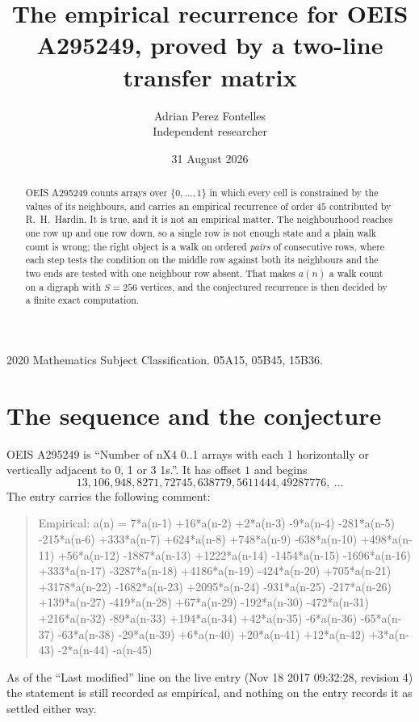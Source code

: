 \documentclass[11pt,a4paper]{article}
\title{The empirical recurrence for OEIS A295249, proved by a two-line transfer matrix}
\author{Adrian Perez Fontelles\\ \small Independent researcher}
\date{31 August 2026}
\theoremstyle{plain}
\theoremstyle{definition}
\begin{document}
\maketitle

\begin{abstract}
OEIS A295249 counts arrays over $\{0,\dots,1\}$ in which every cell is constrained by the
values of its neighbours, and carries an empirical recurrence of order $45$ contributed
by R.~H.~Hardin. It is true, and it is not an empirical matter. The neighbourhood reaches one
row up and one row down, so a single row is not enough state and a plain walk count
is wrong; the right object is a walk on ordered \emph{pairs} of consecutive rows, where
each step tests the condition on the middle row against both its neighbours and the two
ends are tested with one neighbour row absent. That makes $a(n)$ a walk count on a digraph
with $S=256$ vertices, and the conjectured recurrence is then decided by a finite exact
computation.
\end{abstract}

\noindent\small 2020 Mathematics Subject Classification. 05A15, 05B45, 15B36.\normalsize

\section{The sequence and the conjecture}

OEIS A295249 is ``Number of nX4 0..1 arrays with each 1 horizontally or vertically adjacent to 0, 1 or 3 1s.''. It has offset $1$ and begins
\[
13, 106, 948, 8271, 72745, 638779, 5611444, 49287776,\ \dots
\]
The entry carries the following comment:
\begin{quote}\small
Empirical: a(n) = 7*a(n-1) +16*a(n-2) +2*a(n-3) -9*a(n-4) -281*a(n-5) -215*a(n-6) +333*a(n-7) +624*a(n-8) +748*a(n-9) -638*a(n-10) +498*a(n-11) +56*a(n-12) -1887*a(n-13) +1222*a(n-14) -1454*a(n-15) -1696*a(n-16) +333*a(n-17) -3287*a(n-18) +4186*a(n-19) -424*a(n-20) +705*a(n-21) +3178*a(n-22) -1682*a(n-23) +2095*a(n-24) -931*a(n-25) -217*a(n-26) +139*a(n-27) -419*a(n-28) +67*a(n-29) -192*a(n-30) -472*a(n-31) +216*a(n-32) -89*a(n-33) +194*a(n-34) +42*a(n-35) -6*a(n-36) -65*a(n-37) -63*a(n-38) -29*a(n-39) +6*a(n-40) +20*a(n-41) +12*a(n-42) +3*a(n-43) -2*a(n-44) -a(n-45)
\end{quote}
As of the ``Last modified'' line on the live entry (Nov 18 2017 09:32:28, revision 4) the statement is
still recorded as empirical, and nothing on the entry records it as settled either way.
\end{document}
